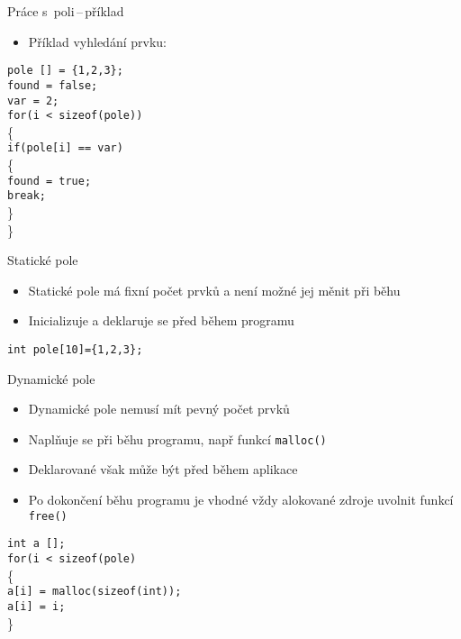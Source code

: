 \documentclass{beamer}
\begin{document}
\begin{frame}{Práce s~poli\,--\,příklad}
    \begin{itemize}
        \item Příklad vyhledání prvku:
    \end{itemize}
    \bigskip
    \texttt{pole [] = \{1,2,3\};}\\
    \texttt{found = false;}\\
    \texttt{var = 2;}\\
    \texttt{for(i < sizeof(pole))}\\
    \{\\
        \qquad\texttt{if(pole[i] == var)}\\
        \qquad\{\\
        \qquad\qquad\texttt{found = true;}\\
        \qquad\qquad\texttt{break;}\\
        \qquad\}\\
    \}
\end{frame}

\begin{frame}{Statické pole}
    \begin{itemize}
        \item Statické pole má fixní počet prvků a není možné jej měnit při běhu
        \item Inicializuje a deklaruje se před během programu
    \end{itemize}
    \bigskip
    \texttt{int pole[10]=\{1,2,3\};}
\end{frame}
\begin{frame}{Dynamické pole}
    \begin{itemize}
        \item Dynamické pole nemusí mít pevný počet prvků
        \item Naplňuje se při běhu programu, např funkcí \texttt{malloc()}
        \item Deklarované však může být před během aplikace
        \item Po dokončení běhu programu je vhodné vždy alokované zdroje uvolnit funkcí \texttt{free()}
    \end{itemize}
    \bigskip
    \texttt{int a [];}\\
    \texttt{for(i < sizeof(pole)}\\
    \{\\
        \qquad\texttt{a[i] = malloc(sizeof(int));}\\
        \qquad\texttt{a[i] = i;}\\
    \}\\
\end{frame}
\end{document}
